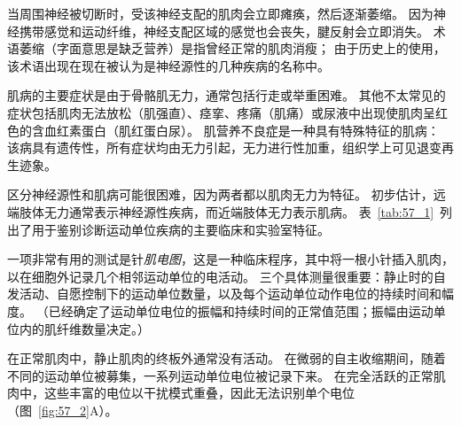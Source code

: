 当周围神经被切断时，受该神经支配的肌肉会立即瘫痪，然后逐渐萎缩。
因为神经携带感觉和运动纤维，神经支配区域的感觉也会丧失，腱反射会立即消失。
术语萎缩（字面意思是缺乏营养）是指曾经正常的肌肉消瘦；
由于历史上的使用，该术语出现在现在被认为是神经源性的几种疾病的名称中。


肌病的主要症状是由于骨骼肌无力，通常包括行走或举重困难。
其他不太常见的症状包括肌肉无法放松（肌强直）、痉挛、疼痛（肌痛）或尿液中出现使肌肉呈红色的含血红素蛋白（肌红蛋白尿）。
肌营养不良症是一种具有特殊特征的肌病：
该病具有遗传性，所有症状均由无力引起，无力进行性加重，组织学上可见退变再生迹象。


区分神经源性和肌病可能很困难，因为两者都以肌肉无力为特征。
初步估计，远端肢体无力通常表示神经源性疾病，而近端肢体无力表示肌病。
表~\ref{tab:57_1}~列出了用于鉴别诊断运动单位疾病的主要临床和实验室特征。


一项非常有用的测试是针\textit{肌电图}，这是一种临床程序，其中将一根小针插入肌肉，以在细胞外记录几个相邻运动单位的电活动。
三个具体测量很重要：静止时的自发活动、自愿控制下的运动单位数量，以及每个运动单位动作电位的持续时间和幅度。
（已经确定了运动单位电位的振幅和持续时间的正常值范围；振幅由运动单位内的肌纤维数量决定。）


在正常肌肉中，静止肌肉的终板外通常没有活动。
在微弱的自主收缩期间，随着不同的运动单位被募集，一系列运动单位电位被记录下来。
在完全活跃的正常肌肉中，这些丰富的电位以干扰模式重叠，因此无法识别单个电位（图~\ref{fig:57_2}A）。



